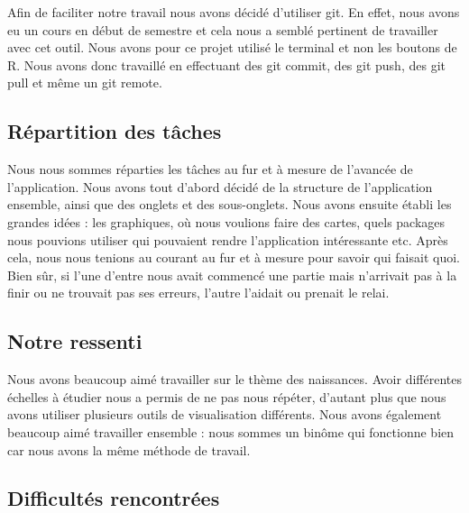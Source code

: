 \documentclass[
]{article}
\begin{document}
Afin de faciliter notre travail nous avons décidé d'utiliser git. En
effet, nous avons eu un cours en début de semestre et cela nous a semblé
pertinent de travailler avec cet outil. Nous avons pour ce projet
utilisé le terminal et non les boutons de R. Nous avons donc travaillé
en effectuant des git commit, des git push, des git pull et même un git
remote.

\hypertarget{ruxe9partition-des-tuxe2ches}{%
\subsection{Répartition des tâches}\label{ruxe9partition-des-tuxe2ches}}

Nous nous sommes réparties les tâches au fur et à mesure de l'avancée de
l'application. Nous avons tout d'abord décidé de la structure de
l'application ensemble, ainsi que des onglets et des sous-onglets. Nous
avons ensuite établi les grandes idées : les graphiques, où nous
voulions faire des cartes, quels packages nous pouvions utiliser qui
pouvaient rendre l'application intéressante etc. Après cela, nous nous
tenions au courant au fur et à mesure pour savoir qui faisait quoi. Bien
sûr, si l'une d'entre nous avait commencé une partie mais n'arrivait pas
à la finir ou ne trouvait pas ses erreurs, l'autre l'aidait ou prenait
le relai.

\hypertarget{notre-ressenti}{%
\subsection{Notre ressenti}\label{notre-ressenti}}

Nous avons beaucoup aimé travailler sur le thème des naissances. Avoir
différentes échelles à étudier nous a permis de ne pas nous répéter,
d'autant plus que nous avons utiliser plusieurs outils de visualisation
différents. Nous avons également beaucoup aimé travailler ensemble :
nous sommes un binôme qui fonctionne bien car nous avons la même méthode
de travail.

\hypertarget{difficultuxe9s-rencontruxe9es}{%
\subsection{Difficultés
rencontrées}\label{difficultuxe9s-rencontruxe9es}}
\end{document}
